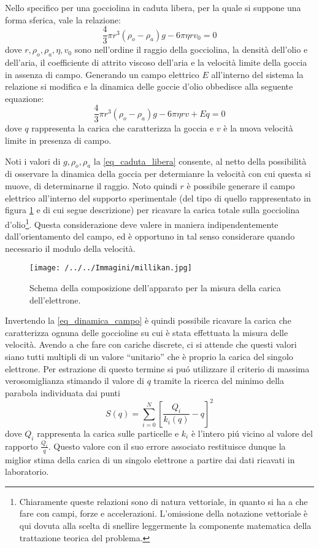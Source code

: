 \documentclass[a4paper,11pt]{article}
\newcommand{\virgolette}[1]{``#1''}
\begin{document}
Nello specifico per una gocciolina in caduta libera, per la quale si suppone una forma sferica, vale la relazione:
\begin{equation}\label{eq_caduta_libera}
\frac{4}{3}\pi r^3 (\rho_o -\rho_a) g - 6 \pi \eta r v_0 =0
\end{equation}
dove $r, \rho_o,\rho_a, \eta, v_0$ sono nell'ordine il raggio della gocciolina, la densità dell'olio e dell'aria, il coefficiente di attrito viscoso dell'aria e la velocità limite della goccia in assenza di campo. Generando un campo elettrico $E$ all'interno del sistema la relazione si modifica e la dinamica delle goccie d'olio obbedisce alla seguente equazione:
\begin{equation}\label{eq_dinamica_campo}
\frac{4}{3}\pi r^3 (\rho_o -\rho_a) g - 6 \pi \eta r v + E q =0
\end{equation}
dove $q$ rappresenta la carica che caratterizza la goccia e $v$ è la nuova velocità limite in presenza di campo.

Noti i valori di $g, \rho_o, \rho_a$ la \ref{eq_caduta_libera} consente, al netto della possibilità di osservare la dinamica della goccia per determianre la velocità con cui questa si muove, di determinarne il raggio. Noto quindi $r$ è possibile generare il campo elettrico all'interno del supporto sperimentale (del tipo di quello rappresentato in figura \ref{millikan} e di cui segue descrizione) per ricavare la carica totale sulla gocciolina d'olio\footnote{Chiaramente queste relazioni sono di natura vettoriale, in quanto si ha a che fare con campi, forze e accelerazioni. L'omissione della notazione vettoriale è qui dovuta alla scelta di snellire leggermente la componente matematica della trattazione teorica del problema.}. Questa considerazione deve valere in maniera indipendentemente dall'orientamento del campo, ed è opportuno in tal senso considerare quando necessario il modulo della velocità.

\begin{figure}[htpb]
	\centering
	\texttt{[image: /../../Immagini/millikan.jpg]} 
	\caption{Schema della composizione dell'apparato per la misura della carica dell'elettrone.}\label{millikan}
\end{figure}

Invertendo la \ref{eq_dinamica_campo} è quindi possibile ricavare la carica che caratterizza ognuna delle goccioline su cui è stata effettuata la misura delle velocità. Avendo a che fare con cariche discrete, ci si attende che questi valori siano tutti multipli di un valore \virgolette{unitario} che è proprio la carica del singolo elettrone. Per estrazione di questo termine si pu\'o utilizzare il criterio di massima verosomiglianza stimando il valore di $q$ tramite la ricerca del minimo della parabola individuata dai punti
\[
	S(q)=\sum_{i=0}^{N}\left[\dfrac{Q_i}{k_i(q)}-q\right]^2
\]
dove $Q_i$ rappresenta la carica sulle particelle e $k_i$ è l'intero pi\'u vicino al valore del rapporto $\frac{Q_i}{q}$. Questo valore con il suo errore associato restituisce dunque la miglior stima della carica di un singolo elettrone a partire dai dati ricavati in laboratorio.
\end{document}

